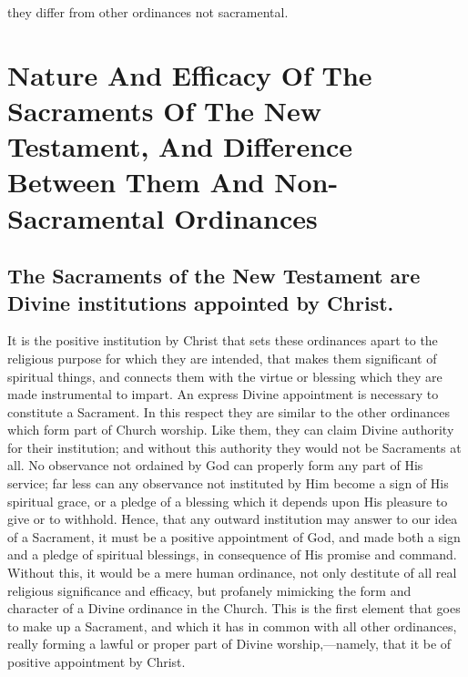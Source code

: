 \documentclass[]{book}
\begin{document}
they differ from other ordinances not sacramental.

\hypertarget{nature-and-efficacy-of-the-sacraments-of-the-new-testament-and-difference-between-them-and-non-sacramental-ordinances}{%
\section{Nature And Efficacy Of The Sacraments Of The New Testament, And Difference Between Them And Non-Sacramental Ordinances}\label{nature-and-efficacy-of-the-sacraments-of-the-new-testament-and-difference-between-them-and-non-sacramental-ordinances}}

\hypertarget{the-sacraments-of-the-new-testament-are-divine-institutions-appointed-by-christ.}{%
\subsection{The Sacraments of the New Testament are Divine institutions appointed by Christ.}\label{the-sacraments-of-the-new-testament-are-divine-institutions-appointed-by-christ.}}

It is the positive institution by Christ that sets these ordinances apart to the religious purpose for which they are intended, that makes them significant of spiritual things, and connects them with the virtue or blessing which they are made instrumental to impart. An express Divine appointment is necessary to constitute a Sacrament. In this respect they are similar to the other ordinances which form part of Church worship. Like them, they can claim Divine authority for their institution; and without this authority they would not be Sacraments at all. No observance not ordained by God can properly form any part of His service; far less can any observance not instituted by Him become a sign of His spiritual grace, or a pledge of a blessing which it depends upon His pleasure to give or to withhold. Hence, that any outward institution may answer to our idea of a Sacrament, it must be a positive appointment of God, and made both a sign and a pledge of spiritual blessings, in consequence of His promise and command. Without this, it would be a mere human ordinance, not only destitute of all real religious significance and efficacy, but profanely mimicking the form and character of a Divine ordinance in the Church. This is the first element that goes to make up a Sacrament, and which it has in common with all other ordinances, really forming a lawful or proper part of Divine worship,---namely, that it be of positive appointment by Christ.
\end{document}

